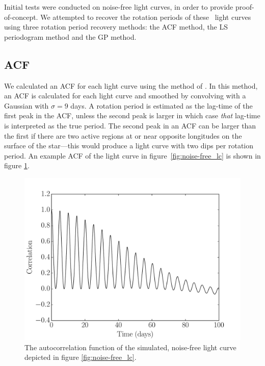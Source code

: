 Initial tests were conducted on noise-free light curves, in order to provide
proof-of-concept.
We attempted to recover the rotation periods of these \nlightcurves\ light
curves
using three rotation period recovery methods: the ACF method, the LS
periodogram method and the GP method.

\subsection{ACF}

We calculated an ACF for each light curve using the method of
\citet{Mcquillan2013}.
In this method, an ACF is calculated for each light curve and smoothed by
convolving with a Gaussian with $\sigma=9$ days.
A rotation period is estimated as the lag-time of the first peak in the ACF,
unless the second peak is larger in which case {\it that} lag-time is
interpreted as the true period.
The second peak in an ACF can be larger than the first if there are two active
regions at or near opposite longitudes on the surface of the star---this would
produce a light curve with two dips per rotation period.
An example ACF of the light curve in figure~\ref{fig:noise-free_lc} is shown
in figure \ref{fig:ACF_example}.

\begin{figure}
\begin{center}
\includegraphics[width=6in, clip=true]{figures/noise-free_acf.pdf}
\caption[An ACF of a simulated light curve.]
{The autocorrelation function of the simulated, noise-free light
curve depicted in figure \ref{fig:noise-free_lc}.}
\label{fig:ACF_example}
\end{center}
\end{figure}

